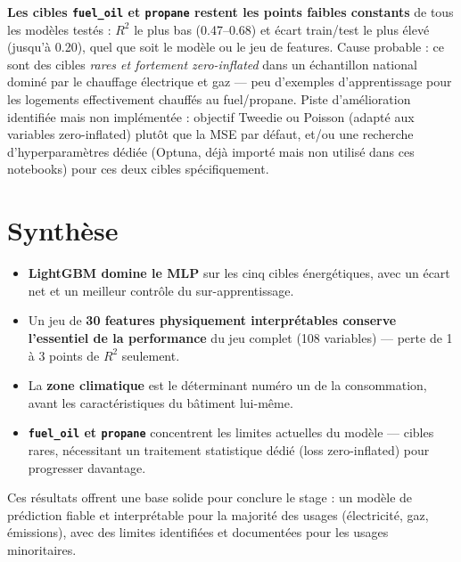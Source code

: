 \documentclass[11pt,a4paper]{article}
\newcommand{\code}[1]{\texttt{#1}}
\begin{document}
\textbf{Les cibles \code{fuel\_oil} et \code{propane} restent les points faibles constants} de
tous les modèles testés : $R^2$ le plus bas (0.47--0.68) et écart train/test le plus élevé (jusqu'à
0.20), quel que soit le modèle ou le jeu de features. Cause probable : ce sont des cibles
\emph{rares et fortement zero-inflated} dans un échantillon national dominé par le chauffage
électrique et gaz --- peu d'exemples d'apprentissage pour les logements effectivement chauffés au
fuel/propane. Piste d'amélioration identifiée mais non implémentée : objectif Tweedie ou Poisson
(adapté aux variables zero-inflated) plutôt que la MSE par défaut, et/ou une recherche
d'hyperparamètres dédiée (Optuna, déjà importé mais non utilisé dans ces notebooks) pour ces deux
cibles spécifiquement.

\section{Synthèse}

\begin{itemize}
    \item \textbf{LightGBM domine le MLP} sur les cinq cibles énergétiques, avec un écart net et
    un meilleur contrôle du sur-apprentissage.
    \item Un jeu de \textbf{30 features physiquement interprétables conserve l'essentiel de la
    performance} du jeu complet (108 variables) --- perte de 1 à 3 points de $R^2$ seulement.
    \item La \textbf{zone climatique} est le déterminant numéro un de la consommation, avant les
    caractéristiques du bâtiment lui-même.
    \item \textbf{\code{fuel\_oil} et \code{propane}} concentrent les limites actuelles du modèle
    --- cibles rares, nécessitant un traitement statistique dédié (loss zero-inflated) pour
    progresser davantage.
\end{itemize}

Ces résultats offrent une base solide pour conclure le stage : un modèle de prédiction fiable et
interprétable pour la majorité des usages (électricité, gaz, émissions), avec des limites
identifiées et documentées pour les usages minoritaires.
\end{document}
